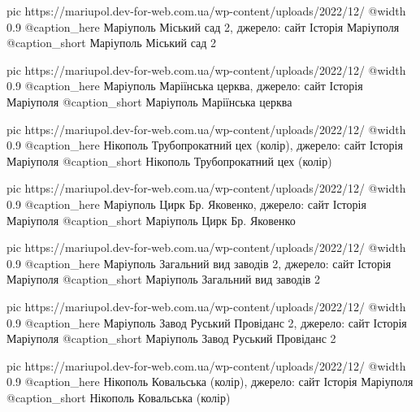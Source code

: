  pic https://mariupol.dev-for-web.com.ua/wp-content/uploads/2022/12/%
  @width 0.9
  @caption_here Маріуполь Міський сад 2, джерело: сайт Історія Маріуполя
  @caption_short Маріуполь Міський сад 2

  pic https://mariupol.dev-for-web.com.ua/wp-content/uploads/2022/12/%
  @width 0.9
  @caption_here Маріуполь Маріїнська церква, джерело: сайт Історія Маріуполя
  @caption_short Маріуполь Маріїнська церква

  pic https://mariupol.dev-for-web.com.ua/wp-content/uploads/2022/12/%
  @width 0.9
  @caption_here Нікополь Трубопрокатний цех (колір), джерело: сайт Історія Маріуполя
  @caption_short Нікополь Трубопрокатний цех (колір)

  pic https://mariupol.dev-for-web.com.ua/wp-content/uploads/2022/12/%
  @width 0.9
  @caption_here Маріуполь Цирк Бр. Яковенко, джерело: сайт Історія Маріуполя
  @caption_short Маріуполь Цирк Бр. Яковенко

  pic https://mariupol.dev-for-web.com.ua/wp-content/uploads/2022/12/%
  @width 0.9
  @caption_here Маріуполь Загальний вид заводів 2, джерело: сайт Історія Маріуполя
  @caption_short Маріуполь Загальний вид заводів 2

  pic https://mariupol.dev-for-web.com.ua/wp-content/uploads/2022/12/%
  @width 0.9
  @caption_here Маріуполь Завод Руський Провіданс 2, джерело: сайт Історія Маріуполя
  @caption_short Маріуполь Завод Руський Провіданс 2

  pic https://mariupol.dev-for-web.com.ua/wp-content/uploads/2022/12/%
  @width 0.9
  @caption_here Нікополь Ковальська (колір), джерело: сайт Історія Маріуполя
  @caption_short Нікополь Ковальська (колір)

